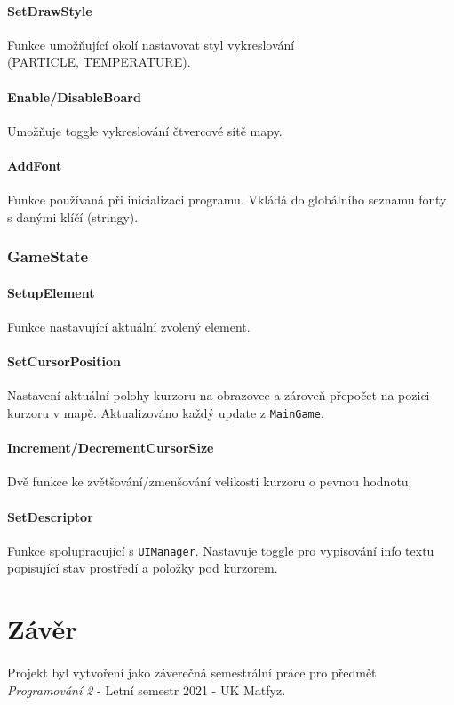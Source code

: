 \documentclass[a4paper, 12pt]{article}
\begin{document}
\paragraph{SetDrawStyle}
Funkce umožňující okolí nastavovat styl vykreslování \\(PARTICLE, TEMPERATURE).

\paragraph{Enable/DisableBoard}
Umožňuje toggle vykreslování čtvercové sítě mapy.

\paragraph{AddFont}
Funkce používaná při inicializaci programu. Vkládá do globálního seznamu fonty
s danými klíčí (stringy).

\subsubsection{GameState}
\paragraph{SetupElement}
Funkce nastavující aktuální zvolený element.

\paragraph{SetCursorPosition}
Nastavení aktuální polohy kurzoru na obrazovce a zároveň přepočet na pozici
kurzoru v mapě. Aktualizováno každý update z \texttt{MainGame}.

\paragraph{Increment/DecrementCursorSize}
Dvě funkce ke zvětšování/zmenšování velikosti kurzoru o pevnou hodnotu.

\paragraph{SetDescriptor}
Funkce spolupracující s \texttt{UIManager}. Nastavuje toggle pro vypisování
info textu popisující stav prostředí a položky pod kurzorem. 

\section{Závěr}
\paragraph{}
Projekt byl vytvoření jako záverečná semestrální práce pro předmět
\\\emph{Programování 2} - Letní semestr 2021 - UK Matfyz.
\end{document}
